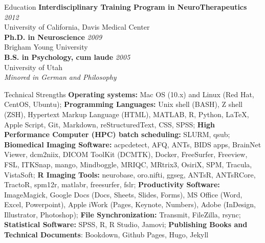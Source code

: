 \documentclass{resume} %
\begin{document}

\begin{rSection}{Education}
	{\bf Interdisciplinary Training Program in NeuroTherapeutics} \hfill {\em 2012}\\
	University of California, Davis Medical Center\\
	{\bf Ph.D. in Neuroscience} \hfill {\em 2009}\\
	Brigham Young University\\
	{\bf B.S. in Psychology, cum laude} \hfill {\em 2005}\\ 
	University of Utah\\ 
	\em{Minored in German and Philosophy}
\end{rSection}

\begin{rSection}{Technical Strengths}
	\textbf{Operating systems:} Mac OS (10.x) and Linux (Red Hat, CentOS, Ubuntu); 
	\textbf{Programming Languages:} Unix shell (BASH), Z shell (ZSH), Hypertext Markup Language (HTML), MATLAB, R, Python, LaTeX, Apple Script, Git, Markdown, reStructuredText, CSS, SPSS;
	\textbf{High Performance Computer (HPC) batch scheduling:} SLURM, qsub;
	\textbf{Biomedical Imaging Software:} acpcdetect, AFQ, ANTs, BIDS apps, BrainNet Viewer, dcm2niix, DICOM ToolKit (DCMTK), Docker, FreeSurfer, Freeview, FSL, ITKSnap, mango, Mindboggle, MRIQC, MRtrix3, OsiriX, SPM, Tracula, VistaSoft;
	\textbf{R Imaging Tools:} neurobase, oro.nifti, ggseg, ANTsR, ANTsRCore, TractoR, spm12r, matlabr, freesurfer, fslr;
	\textbf{Productivity Software:} ImageMagick, Google Docs (Docs, Sheets, Slides, Forms), MS Office (Word, Excel, Powerpoint), Apple iWork (Pages, Keynote, Numbers), Adobe (InDesign, Illustrator, Photoshop);
	\textbf{File Synchronization:} Transmit, FileZilla, rsync;
	\textbf{Statistical Software:} SPSS, R, R Studio, Jamovi;
	\textbf{Publishing Books and Technical Documents}: Bookdown, Github Pages, Hugo, Jekyll
\end{rSection}
\end{document}
